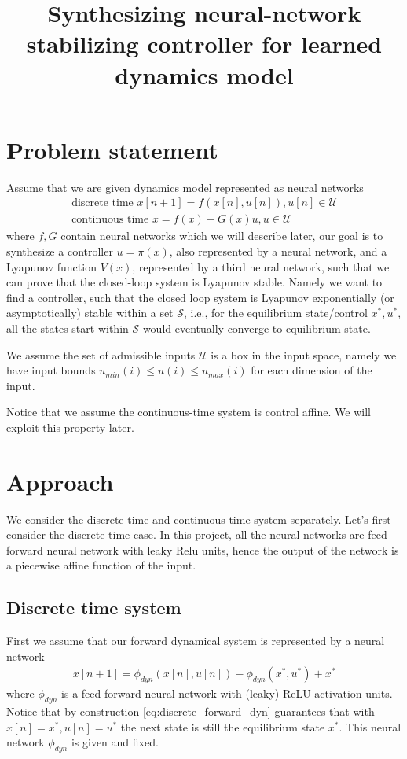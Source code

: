 \documentclass{article}
\title{Synthesizing neural-network stabilizing controller for learned dynamics model}
\begin{document}
\section{Problem statement}
Assume that we are given dynamics model represented as neural networks
\begin{align}
	\text{discrete time } x[n+1] = f(x[n], u[n]) , u[n]\in\mathcal{U}\\
	\text{continuous time } \dot{x} = f(x) + G(x)u, u\in\mathcal{U}
\end{align}
where $f, G$ contain neural networks which we will describe later, our goal is to synthesize a controller $u=\pi(x)$, also represented by a neural network, and a Lyapunov function $V(x)$, represented by a third neural network, such that we can prove that the closed-loop system is Lyapunov stable. Namely we want to find a controller, such that the closed loop system is Lyapunov exponentially (or asymptotically) stable within a set $\mathcal{S}$, i.e., for the equilibrium state/control $x^*, u^*$, all the states start within $\mathcal{S}$ would eventually converge to equilibrium state.

We assume the set of admissible inputs $\mathcal{U}$ is a box in the input space, namely we have input bounds $u_{min}(i)\leq u(i)\leq u_{max}(i)$ for each dimension of the input.

Notice that we assume the continuous-time system is control affine. We will exploit this property later.

\section{Approach}
We consider the discrete-time and continuous-time system separately. Let's first consider the discrete-time case. In this project, all the neural networks are feed-forward neural network with leaky Relu units, hence the output of the network is a piecewise affine function of the input.
\subsection{Discrete time system}
First we assume that our forward dynamical system is represented by a neural network
\begin{align}
	x[n+1] = \phi_{dyn}(x[n], u[n]) - \phi_{dyn}(x^*, u^*) + x^* \label{eq:discrete_forward_dyn}
\end{align}
where $\phi_{dyn}$ is a feed-forward neural network with (leaky) ReLU activation units. Notice that by construction \eqref{eq:discrete_forward_dyn} guarantees that with $x[n]=x^*, u[n]=u^*$ the next state is still the equilibrium state $x^*$. This neural network $\phi_{dyn}$ is given and fixed.
\end{document}

